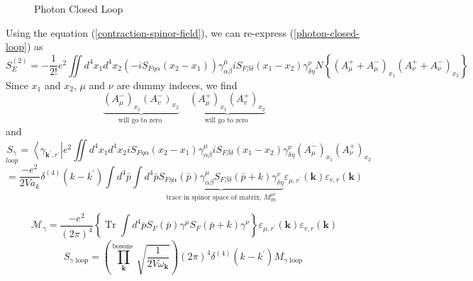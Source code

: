 \begin{figure}[H]
    
    \caption{Photon Closed Loop}
    \label{fig:photon-closed-loop}
\end{figure}

Using the equation (\ref{contraction-spinor-field}), we can re-express (\ref{photon-closed-loop}) as
\begin{equation}
S_{E}^{(2)}=-\frac{1}{2 !} e^{2} \iint d^{4} x_{1} d^{4} x_{2}\left(-i S_{F \eta \alpha}\left(x_{2}-x_{1}\right)\right) \gamma_{\alpha \beta}^{\mu} i S_{F \beta \delta}\left(x_{1}-x_{2}\right) \gamma_{\delta \eta}^{\nu} N\left\{\left(A_{\mu}^{+}+A_{\mu}^{-}\right)_{x_{1}}\left(A_{\nu}^{+}+A_{\nu}^{-}\right)_{x_{2}}\right\}
\end{equation}
Since $x_1$ and $x_2$, $\mu$ and $\nu$ are dummy indeces, we find
$$
\underbrace{\left(A_{\mu}^{-}\right)_{x_{1}}\left(A_{v}^{-}\right)_{x_{2}}}_{\text {will go to zero }}\quad\underbrace{\left(A_{\mu}^{+}\right)_{x_{1}}\left(A_{v}^{+}\right)_{x_{2}}}_{\text {will go to zero }}
$$
and
$$
\underset{loop}{S_{\gamma}}=\left\langle\gamma_{\mathbf{k}^{\prime}, r^{\prime}}\right| e^{2} \iint d^{4} x_{1} d^{4} x_{2} i S_{F \eta \alpha}\left(x_{2}-x_{1}\right) \gamma_{\alpha \beta}^{\mu} i S_{F \beta \delta}\left(x_{1}-x_{2}\right) \gamma_{\delta \eta}^{\nu}\left(A_{\mu}^{-}\right)_{x_{1}}\left(A_{\nu}^{+}\right)_{x_{2}}
$$
$$
=\frac{-e^{2}}{2 V a_{k}} \delta^{(4)}\left(k-k^{\prime}\right) \int d^{4} \bar{p}\int d^{4} \bar{p} \underbrace{S_{F \eta \alpha}(\bar{p}) \gamma_{\alpha \beta}^{\mu} S_{F \beta \delta}(\bar{p}+k) \gamma_{\delta \eta}^{v}}_{\text {trace in spinor space of matrix, } M_{\eta \eta}^{\mu v}}\varepsilon_{\mu, r^{\prime}}(\mathbf{k}) \varepsilon_{v, r}(\mathbf{k})
$$
\begin{qt}
    \begin{equation}
\mathcal{M}_{\gamma}=\frac{-e^{2}}{(2 \pi)^{4}}\left\{\operatorname{Tr} \int d^{4} \bar{p} S_{F}(\bar{p}) \gamma^{\mu} S_{F}(\bar{p}+k) \gamma^{\nu}\right\} \varepsilon_{\mu, r^{\prime}}(\mathbf{k}) \varepsilon_{v, r}(\mathbf{k})
\end{equation}
\begin{equation}
S_{\gamma{\text { loop}}}=\left(\prod_{\mathbf{k}}^{\text {bosons }} \sqrt{\frac{1}{2 V \omega_{\mathbf{k}}}}\right)(2 \pi)^{4} \delta^{(4)}\left(k-k^{\prime}\right) M_{\gamma \text { loop }}
\end{equation}
\end{qt}
